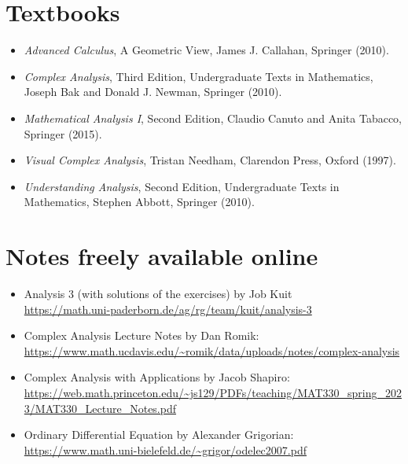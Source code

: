 \documentclass{article}
\begin{document}
\section*{Textbooks}
\begin{itemize}
    \item \textit{Advanced Calculus}, A Geometric View, James J. Callahan, Springer (2010).
    \item \textit{Complex Analysis}, Third Edition, Undergraduate Texts in Mathematics, Joseph Bak and Donald J. Newman, Springer (2010).
    \item \textit{Mathematical Analysis I}, Second Edition, Claudio Canuto and Anita Tabacco, Springer (2015).
    \item \textit{Visual Complex Analysis}, Tristan Needham, Clarendon Press, Oxford (1997).
    \item \textit{Understanding Analysis}, Second Edition, Undergraduate Texts in Mathematics, Stephen Abbott, Springer (2010).
\end{itemize}

\section*{Notes freely available online}
\begin{itemize}
    \item Analysis 3 (with solutions of the exercises) by Job Kuit\\
    \url{https://math.uni-paderborn.de/ag/rg/team/kuit/analysis-3}
    \item Complex Analysis Lecture Notes by Dan Romik:\\ \url{https://www.math.ucdavis.edu/~romik/data/uploads/notes/complex-analysis}
    \item Complex Analysis with Applications by Jacob Shapiro:\\
\url{https://web.math.princeton.edu/~js129/PDFs/teaching/MAT330_spring_2023/MAT330_Lecture_Notes.pdf}
\item Ordinary Differential Equation by Alexander Grigorian:\\
\url{https://www.math.uni-bielefeld.de/~grigor/odelec2007.pdf}
\end{itemize}
\end{document}
